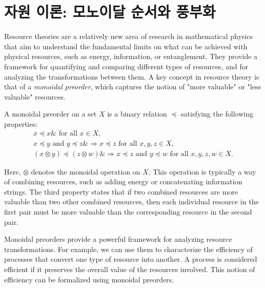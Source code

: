 \documentclass[11pt, a4paper, twoside, openany]{book}
\begin{document}
\chapter{자원 이론: 모노이달 순서와 풍부화}
\label{ch:2}
\vspace{12pt}

Resource theories are a relatively new area of research in mathematical physics that aim to understand the fundamental limits on what can be achieved with physical resources, such as energy, information, or entanglement.  They provide a framework for quantifying and comparing different types of resources, and for analyzing the transformations between them. A key concept in resource theory is that of a \textit{monoidal preorder}, which captures the notion of "more valuable" or "less valuable" resources.

\par\medskip
A monoidal preorder on a set $X$ is a binary relation $\preceq$ satisfying the following properties:
\begin{align*}
x \preceq x \&\text{ for all } x \in X, \\
x \preceq y \text{ and } y \preceq z \&\Rightarrow x \preceq z \text{ for all } x, y, z \in X, \\
(x \otimes y) \preceq (z \otimes w) \&\Rightarrow x \preceq z \text{ and } y \preceq w \text{ for all } x, y, z, w \in X.
\end{align*}

\par\medskip
Here, $\otimes$ denotes the monoidal operation on $X$. This operation is typically a way of combining resources, such as adding energy or concatenating information strings. The third property states that if two combined resources are more valuable than two other combined resources, then each individual resource in the first pair must be more valuable than the corresponding resource in the second pair.

\par\medskip
Monoidal preorders provide a powerful framework for analyzing resource transformations. For example, we can use them to characterize the efficiency of processes that convert one type of resource into another. A process is considered efficient if it preserves the overall value of the resources involved.  This notion of efficiency can be formalized using monoidal preorders.
\end{document}
